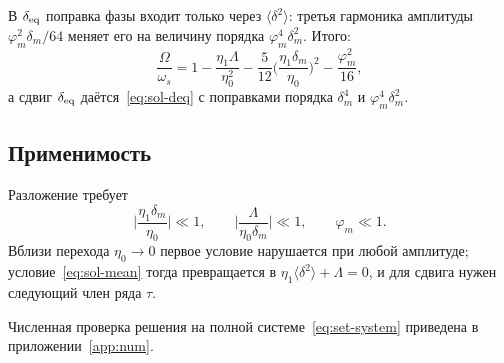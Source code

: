 В $\delta_{\mathrm{eq}}$ поправка фазы входит только через $\langle\delta^2\rangle$: третья гармоника амплитуды $\varphi_m^2\delta_m/64$ меняет его на величину порядка $\varphi_m^4\delta_m^2$. Итого:
\begin{equation}
\label{eq:sol-omega-sum}
\frac{\Omega}{\omega_s}=1-\frac{\eta_1\Lambda}{\eta_0^2}-\frac{5}{12}\Biggl(\frac{\eta_1\delta_m}{\eta_0}\Biggr)^2-\frac{\varphi_m^2}{16},
\end{equation}
а сдвиг $\delta_{\mathrm{eq}}$ даётся~\eqref{eq:sol-deq} с поправками порядка $\delta_m^4$ и $\varphi_m^4\delta_m^2$.

\subsection{Применимость}

Разложение требует
\begin{equation}
\label{eq:sol-valid}
\Biggl|\frac{\eta_1\delta_m}{\eta_0}\Biggr|\ll 1,
\qquad
\Biggl|\frac{\Lambda}{\eta_0\delta_m}\Biggr|\ll 1,
\qquad
\varphi_m\ll 1.
\end{equation}
Вблизи перехода $\eta_0\to 0$ первое условие нарушается при любой амплитуде; условие~\eqref{eq:sol-mean} тогда превращается в $\eta_1\langle\delta^2\rangle+\Lambda=0$, и для сдвига нужен следующий член ряда $\tau$.

Численная проверка решения на полной системе~\eqref{eq:set-system} приведена в приложении~\ref{app:num}.
